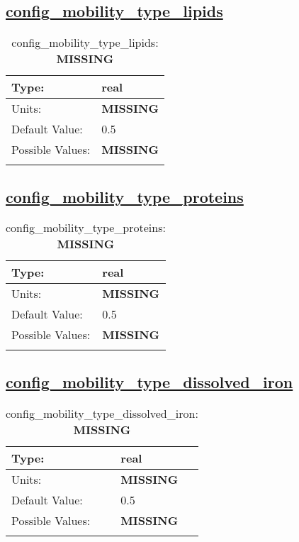 \subsection[config\_mobility\_type\_lipids]{\hyperref[sec:nm_tab_biogeochemistry]{config\_mobility\_type\_lipids}}
\label{subsec:nm_sec_config_mobility_type_lipids}
\begin{center}
\begin{longtable}{| p{2.0in} || p{4.0in} |}
    \hline
    Type: & real \\
    \hline
    Units: & {\bf \color{red} MISSING} \\
    \hline
    Default Value: & 0.5 \\
    \hline
    Possible Values: & {\bf \color{red} MISSING} \\
    \hline
    \caption{config\_mobility\_type\_lipids: {\bf \color{red} MISSING}}
\end{longtable}
\end{center}
\subsection[config\_mobility\_type\_proteins]{\hyperref[sec:nm_tab_biogeochemistry]{config\_mobility\_type\_proteins}}
\label{subsec:nm_sec_config_mobility_type_proteins}
\begin{center}
\begin{longtable}{| p{2.0in} || p{4.0in} |}
    \hline
    Type: & real \\
    \hline
    Units: & {\bf \color{red} MISSING} \\
    \hline
    Default Value: & 0.5 \\
    \hline
    Possible Values: & {\bf \color{red} MISSING} \\
    \hline
    \caption{config\_mobility\_type\_proteins: {\bf \color{red} MISSING}}
\end{longtable}
\end{center}
\subsection[config\_mobility\_type\_dissolved\_iron]{\hyperref[sec:nm_tab_biogeochemistry]{config\_mobility\_type\_dissolved\_iron}}
\label{subsec:nm_sec_config_mobility_type_dissolved_iron}
\begin{center}
\begin{longtable}{| p{2.0in} || p{4.0in} |}
    \hline
    Type: & real \\
    \hline
    Units: & {\bf \color{red} MISSING} \\
    \hline
    Default Value: & 0.5 \\
    \hline
    Possible Values: & {\bf \color{red} MISSING} \\
    \hline
    \caption{config\_mobility\_type\_dissolved\_iron: {\bf \color{red} MISSING}}
\end{longtable}
\end{center}
